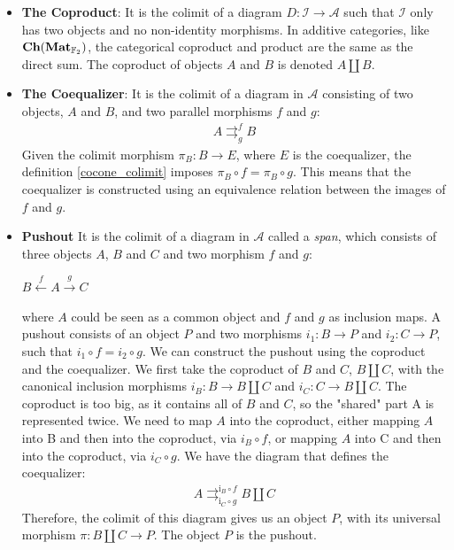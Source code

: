 \documentclass[12pt, twoside, openany]{book}
\newcommand{\catname}[1]{{\normalfont\textbf{#1}}}
\newcommand{\Ch}{\catname{Ch}}
\newcommand{\Mat}{\catname{Mat}}
\begin{document}
\begin{itemize}
    \item \textbf{The Coproduct}: It is the colimit of a diagram $D : \mathcal{I} \rightarrow \mathcal{A}$ such that $\mathcal{I}$ only has two objects and no non-identity morphisms. In additive categories, like $\Ch(\Mat_{\mathbb{F}_2})$, the categorical coproduct and product are the same as the direct sum. The coproduct of objects $A$ and $B$ is denoted $A \amalg B$.
    \item \textbf{The Coequalizer}: It is the colimit of a diagram in $\mathcal{A}$ consisting of two objects, $A$ and $B$, and two parallel morphisms $f$ and $g$:
    \begin{align*}
        A \mathrel{\mathop{\rightrightarrows}^{f}_{g}} B
    \end{align*}
    Given the colimit morphism $\pi_B: B \rightarrow E$, where $E$ is the coequalizer, the definition \ref{cocone_colimit} imposes $\pi_B \circ f = \pi_B \circ g$. This means that the coequalizer is constructed using an equivalence relation between the images of $f$ and $g$.
    \item \textbf{Pushout} It is the colimit of a diagram in $\mathcal{A}$ called a \textit{span}, which consists of three objects $A$, $B$ and $C$ and two morphism $f$ and $g$:
    \begin{center}
        $B \xleftarrow{f} A \xrightarrow{g} C$
    \end{center}
    where $A$ could be seen as a common object and $f$ and $g$ as inclusion maps. A pushout consists of an object $P$ and two morphisms $i_1: B \rightarrow P$ and $i_2: C \rightarrow P$, such that $i_1 \circ f = i_2 \circ g$. We can construct the pushout using the coproduct and the coequalizer. We first take the coproduct of $B$ and $C$, $B \amalg C$, with the canonical inclusion morphisms $i_B: B \rightarrow B \amalg C$ and $i_C: C \rightarrow B \amalg C$. The coproduct is too big, as it contains all of $B$ and $C$, so the "shared" part A is represented twice. We need to map $A$ into the coproduct, either mapping $A$ into B and then into the coproduct, via $i_B \circ f$, or mapping $A$ into C and then into the coproduct, via $i_C \circ g$. We have the diagram that defines the coequalizer:
    \begin{align*}
        A \mathrel{\mathop{\rightrightarrows}^{\text{i}_B \circ f}_{\text{i}_C \circ g}} B \amalg C
    \end{align*}
    Therefore, the colimit of this diagram gives us an object $P$, with its universal morphism $\pi : B \amalg C \rightarrow P$. The object $P$ is the pushout.
\end{itemize}
\end{document}
